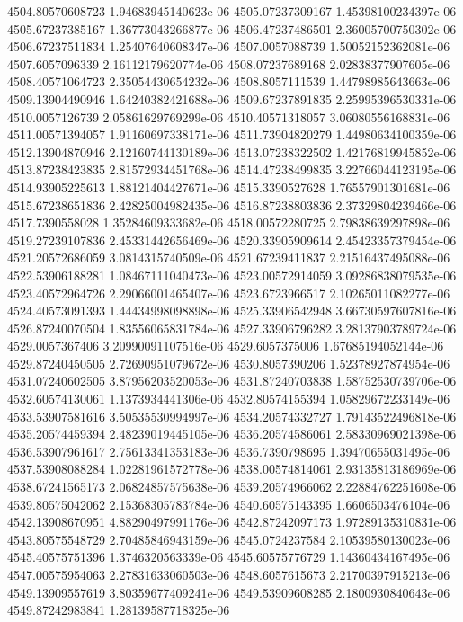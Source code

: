 {4504.80570608723 1.94683945140623e-06
4505.07237309167 1.45398100234397e-06
4505.67237385167 1.36773043266877e-06
4506.47237486501 2.36005700750302e-06
4506.67237511834 1.25407640608347e-06
4507.0057088739 1.50052152362081e-06
4507.6057096339 2.16112179620774e-06
4508.07237689168 2.02838377907605e-06
4508.40571064723 2.35054430654232e-06
4508.8057111539 1.44798985643663e-06
4509.13904490946 1.64240382421688e-06
4509.67237891835 2.25995396530331e-06
4510.0057126739 2.05861629769299e-06
4510.40571318057 3.06080556168831e-06
4511.00571394057 1.91160697338171e-06
4511.73904820279 1.44980634100359e-06
4512.13904870946 2.12160744130189e-06
4513.07238322502 1.42176819945852e-06
4513.87238423835 2.81572934451768e-06
4514.47238499835 3.22766044123195e-06
4514.93905225613 1.88121404427671e-06
4515.3390527628 1.76557901301681e-06
4515.67238651836 2.42825004982435e-06
4516.87238803836 2.37329804239466e-06
4517.7390558028 1.35284609333682e-06
4518.00572280725 2.79838639297898e-06
4519.27239107836 2.45331442656469e-06
4520.33905909614 2.45423357379454e-06
4521.20572686059 3.0814315740509e-06
4521.67239411837 2.21516437495088e-06
4522.53906188281 1.08467111040473e-06
4523.00572914059 3.09286838079535e-06
4523.40572964726 2.29066001465407e-06
4523.6723966517 2.10265011082277e-06
4524.40573091393 1.44434998098898e-06
4525.33906542948 3.66730597607816e-06
4526.87240070504 1.83556065831784e-06
4527.33906796282 3.28137903789724e-06
4529.0057367406 3.20990091107516e-06
4529.6057375006 1.67685194052144e-06
4529.87240450505 2.72690951079672e-06
4530.8057390206 1.52378927874954e-06
4531.07240602505 3.87956203520053e-06
4531.87240703838 1.58752530739706e-06
4532.60574130061 1.1373934441306e-06
4532.80574155394 1.05829672233149e-06
4533.53907581616 3.50535530994997e-06
4534.20574332727 1.79143522496818e-06
4535.20574459394 2.48239019445105e-06
4536.20574586061 2.58330969021398e-06
4536.53907961617 2.75613341353183e-06
4536.7390798695 1.39470655031495e-06
4537.53908088284 1.02281961572778e-06
4538.00574814061 2.93135813186969e-06
4538.67241565173 2.06824857575638e-06
4539.20574966062 2.22884762251608e-06
4539.80575042062 2.15368305783784e-06
4540.60575143395 1.6606503476104e-06
4542.13908670951 4.88290497991176e-06
4542.87242097173 1.97289135310831e-06
4543.80575548729 2.70485846943159e-06
4545.0724237584 2.10539580130023e-06
4545.40575751396 1.3746320563339e-06
4545.60575776729 1.14360434167495e-06
4547.00575954063 2.27831633060503e-06
4548.6057615673 2.21700397915213e-06
4549.13909557619 3.80359677409241e-06
4549.53909608285 2.1800930840643e-06
4549.87242983841 1.28139587718325e-06
}
